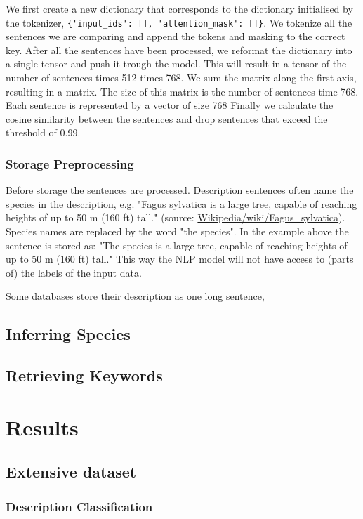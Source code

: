 \documentclass[a4paper, 12pt, oneside]{book} %
\begin{document}
We first create a new dictionary that corresponds to the dictionary initialised by the tokenizer, \verb|{'input_ids': [], 'attention_mask': []}|.
We tokenize all the sentences we are comparing and append the tokens and masking to the correct key.
After all the sentences have been processed, we reformat the dictionary into a single tensor and push it trough the model.
This will result in a tensor of the number of sentences times 512 times 768. 
We sum the matrix along the first axis, resulting in a matrix.
The size of this matrix is the number of sentences time 768.
Each sentence is represented by a vector of size 768
Finally we calculate the cosine similarity between the sentences and drop sentences that exceed the threshold of 0.99.

\subsubsection{Storage Preprocessing}
Before storage the sentences are processed.
Description sentences often name the species in the description, e.g. "Fagus sylvatica is a large tree, capable of reaching heights of up to 50 m (160 ft) tall." (source: \href{https://en.wikipedia.org/wiki/Fagus_sylvatica}{Wikipedia/wiki/Fagus\_sylvatica}).
Species names are replaced by the word "the species". 
In the example above the sentence is stored as: "The species is a large tree, capable of reaching heights of up to 50 m (160 ft) tall."
This way the NLP model will not have access to (parts of) the labels of the input data.

Some databases store their description as one long sentence,

\subsection{Inferring Species}
\subsection{Retrieving Keywords}


\newpage
\section{Results}
\subsection{Extensive dataset}
\subsubsection{Description Classification}
\end{document}
